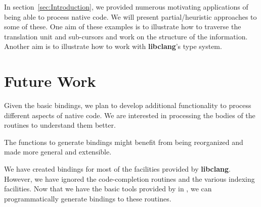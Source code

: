 \documentclass[article]{jss}
\def\R{\proglang{R}}
\def\Rpkg#1{\pkg{#1}}
\def\libclang{\textbf{libclang}}
\begin{document}
In section~\ref{sec:Introduction}, we provided numerous motivating
applications of being able to process native code.  We will present
partial/heuristic approaches to some of these.  One aim of these
examples is to illustrate how to traverse the translation unit and
sub-cursors and work on the structure of the information.  Another aim
is to illustrate how to work with \libclang's type system.






\section{Future Work}

Given the basic bindings, we plan to develop additional functionality
to process different aspects of native code. We are interested in
processing the bodies of the routines to understand them better.

The functions to generate bindings might benefit from being
reorganized and made more general and extensible.

We have created bindings for most of the facilities provided by
\libclang.  However, we have ignored the code-completion routines and
the various indexing facilities.  Now that we have the basic tools
provided by \Rpkg{RCIndex} in \R, we can programmatically generate
bindings to these routines. 



\end{document}
